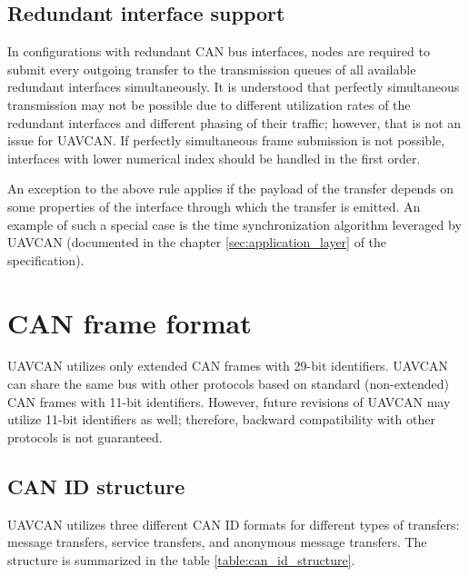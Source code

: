 \subsection{Redundant interface support}

In configurations with redundant CAN bus interfaces,
nodes are required to submit every outgoing transfer to the transmission queues of
all available redundant interfaces simultaneously.
It is understood that perfectly simultaneous transmission may not be possible due to different
utilization rates of the redundant interfaces and different phasing of their traffic;
however, that is not an issue for UAVCAN.
If perfectly simultaneous frame submission is not possible, interfaces with lower numerical index
should be handled in the first order.

An exception to the above rule applies if the payload of the transfer depends on some properties
of the interface through which the transfer is emitted.
An example of such a special case is the time synchronization algorithm leveraged by UAVCAN
(documented in the chapter \ref{sec:application_layer} of the specification).

\section{CAN frame format}

UAVCAN utilizes only extended CAN frames with 29-bit identifiers.
UAVCAN can share the same bus with other protocols based on standard (non-extended) CAN frames with 11-bit identifiers.
However, future revisions of UAVCAN may utilize 11-bit identifiers as well;
therefore, backward compatibility with other protocols is not guaranteed.

\subsection{CAN ID structure}

UAVCAN utilizes three different CAN ID formats for different types of transfers:
message transfers, service transfers, and anonymous message transfers.
The structure is summarized in the table \ref{table:can_id_structure}.

